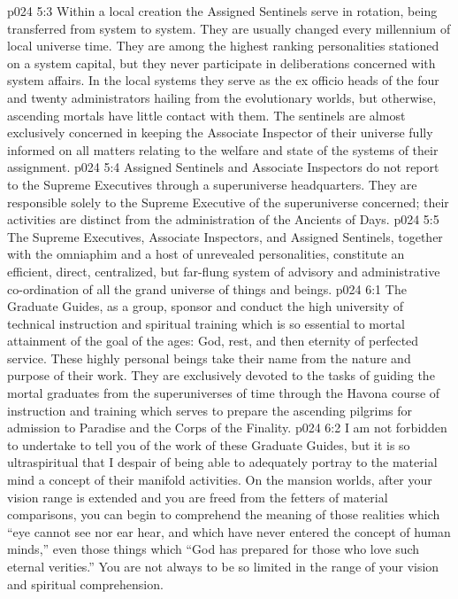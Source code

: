 \vs p024 5:3 Within a local creation the Assigned Sentinels serve in rotation, being transferred from system to system. They are usually changed every millennium of local universe time. They are among the highest ranking personalities stationed on a system capital, but they never participate in deliberations concerned with system affairs. In the local systems they serve as the ex officio heads of the four and twenty administrators hailing from the evolutionary worlds, but otherwise, ascending mortals have little contact with them. The sentinels are almost exclusively concerned in keeping the Associate Inspector of their universe fully informed on all matters relating to the welfare and state of the systems of their assignment.
\vs p024 5:4 Assigned Sentinels and Associate Inspectors do not report to the Supreme Executives through a superuniverse headquarters. They are responsible solely to the Supreme Executive of the superuniverse concerned; their activities are distinct from the administration of the Ancients of Days.
\pc \vs p024 5:5 The Supreme Executives, Associate Inspectors, and Assigned Sentinels, together with the omniaphim and a host of unrevealed personalities, constitute an efficient, direct, centralized, but far\hyp{}flung system of advisory and administrative co\hyp{}ordination of all the grand universe of things and beings.
%
\vs p024 6:1 The Graduate Guides, as a group, sponsor and conduct the high university of technical instruction and spiritual training which is so essential to mortal attainment of the goal of the ages: God, rest, and then eternity of perfected service. These highly personal beings take their name from the nature and purpose of their work. They are exclusively devoted to the tasks of guiding the mortal graduates from the superuniverses of time through the Havona course of instruction and training which serves to prepare the ascending pilgrims for admission to Paradise and the Corps of the Finality.
\vs p024 6:2 I am not forbidden to undertake to tell you of the work of these Graduate Guides, but it is so ultraspiritual that I despair of being able to adequately portray to the material mind a concept of their manifold activities. On the mansion worlds, after your vision range is extended and you are freed from the fetters of material comparisons, you can begin to comprehend the meaning of those realities which “eye cannot see nor ear hear, and which have never entered the concept of human minds,” even those things which “God has prepared for those who love such eternal verities.” You are not always to be so limited in the range of your vision and spiritual comprehension.
